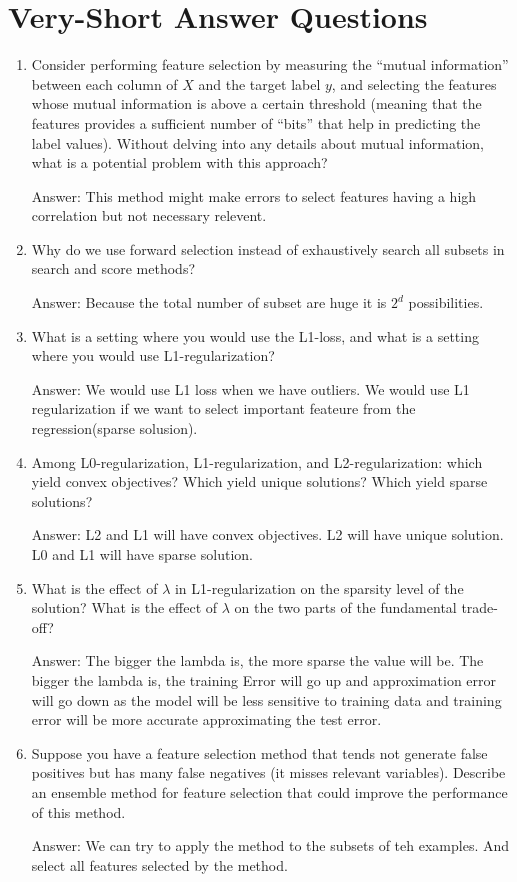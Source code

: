 \documentclass{article}
\def\ans#1{\par\gre{Answer: #1}}
\def\gre#1{{\color{gre}#1}}
\def\enum#1{\begin{enumerate}#1\end{enumerate}}
\begin{document}
\section{Very-Short Answer Questions}

\enum{
\item Consider performing feature selection by measuring the ``mutual information'' between each column of $X$ and the target label $y$, and selecting the features whose mutual information is above a certain threshold (meaning that the features provides a sufficient number of ``bits'' that help in predicting the label values). Without delving into any details about mutual information, what is a potential problem with this approach? \ans{This method might make errors to select features having a high correlation but not necessary relevent.}
\item Why do we use forward selection instead of exhaustively search all subsets in search and score methods? \ans{Because the total number of subset are huge it is $2^d$ possibilities.}
\item What is a setting where you would use the L1-loss, and what is a setting where you would use L1-regularization? \ans{We would use L1 loss when we have outliers. We would use L1 regularization if we want to select important feateure from the regression(sparse solusion).}
\item Among L0-regularization, L1-regularization, and L2-regularization: which yield convex objectives? Which yield unique solutions? Which yield sparse solutions? \ans{L2 and L1 will have convex objectives. L2 will have unique solution. L0 and L1 will have sparse solution.}
\item What is the effect of $\lambda$ in L1-regularization on the sparsity level of the solution? What is the effect of $\lambda$ on the two parts of the fundamental trade-off? \ans{The bigger the lambda is, the more sparse the value will be. The bigger the lambda is, the training Error will go up and approximation error will go down as the model will be less sensitive to training data and training error will be more accurate approximating the test error.}
\item Suppose you have a feature selection method that tends not generate false positives but has many false negatives (it misses relevant variables). Describe an ensemble method for feature selection that could improve the performance of this method. \ans{We can try to apply the method to the subsets of teh examples. And select all features selected by the method.}
}
\end{document}
